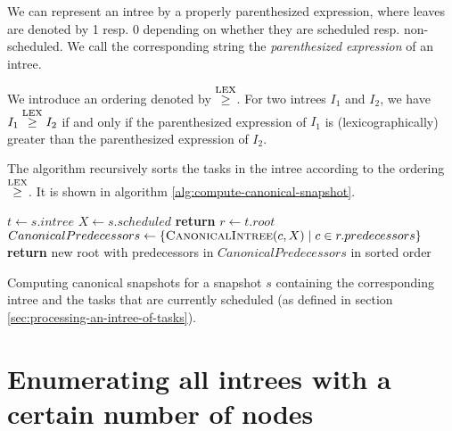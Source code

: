 \begin{definition}
  We can represent an intree by a properly parenthesized expression, where leaves are denoted by 1 resp. 0 depending on whether they are scheduled resp. non-scheduled. We call the corresponding string the \emph{parenthesized expression} of an intree.

  We introduce an ordering denoted by $\stackrel{\text{LEX}}{\geq}$. For two intrees $I_1$ and $I_2$, we have $I_1 \stackrel{\text{LEX}}{\geq} I_2$ if and only if the parenthesized expression of $I_1$ is (lexicographically) greater than the parenthesized expression of $I_2$.
\end{definition}


The algorithm recursively sorts the tasks in the intree according to the ordering $\stackrel{\text{LEX}}{\geq}$. It is shown in algorithm \ref{alg:compute-canonical-snapshot}.

\begin{algorithm}
  \begin{algorithmic}
     
    \State $t \gets s.intree$ 
    \State $X \gets s.scheduled$ 
    \State \textbf{return}  
    \EndProcedure
    \Statex
    \State $r \gets t.root$ 
    \State $CanonicalPredecessors \gets 
           \left\{ \Call{CanonicalIntree}{c, X} \mid c \in r.predecessors \right\}$
    \State \textbf{return} new root with predecessors in $CanonicalPredecessors$ in sorted order
    \EndProcedure
  \end{algorithmic}
  \caption{Computing canonical snapshots for a snapshot $s$ containing the corresponding intree and the tasks that are currently scheduled (as defined in section \ref{sec:processing-an-intree-of-tasks}).}
  \label{alg:compute-canonical-snapshot}
\end{algorithm}


\section{Enumerating all intrees with a certain number of nodes}
\label{sec:enumerating-all-intrees}

